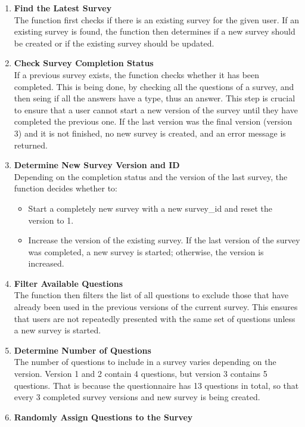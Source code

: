\begin{enumerate}
    \item \textbf{Find the Latest Survey} \\
    The function first checks if there is an existing survey for the given user. If an existing survey is found, the function then determines if a new survey should be created or if the existing survey should be updated.
    \item \textbf{Check Survey Completion Status} \\
    If a previous survey exists, the function checks whether it has been completed. This is being done, by checking all the questions of a survey, and then seing if all the answers have a type, thus an answer. This step is crucial to ensure that a user cannot start a new version of the survey until they have completed the previous one. If the last version was the final version (version 3) and it is not finished, no new survey is created, and an error message is returned.
    \item \textbf{Determine New Survey Version and ID} \\
    Depending on the completion status and the version of the last survey, the function decides whether to:
    \begin{itemize}
        \item Start a completely new survey with a new survey\_id and reset the version to 1.
        \item Increase the version of the existing survey. If the last version of the survey was completed, a new survey is started; otherwise, the version is increased.
    \end{itemize}
    \item \textbf{Filter Available Questions} \\
    The function then filters the list of all questions to exclude those that have already been used in the previous versions of the current survey. This ensures that users are not repeatedly presented with the same set of questions unless a new survey is started.
    \item \textbf{Determine Number of Questions} \\
    The number of questions to include in a survey varies depending on the version. Version 1 and 2 contain 4 questions, but version 3 contains 5 questions. That is because the questionnaire has 13 questions in total, so that every 3 completed survey versions and new survey is being created.
    \item \textbf{Randomly Assign Questions to the Survey} \\

\end{enumerate}
